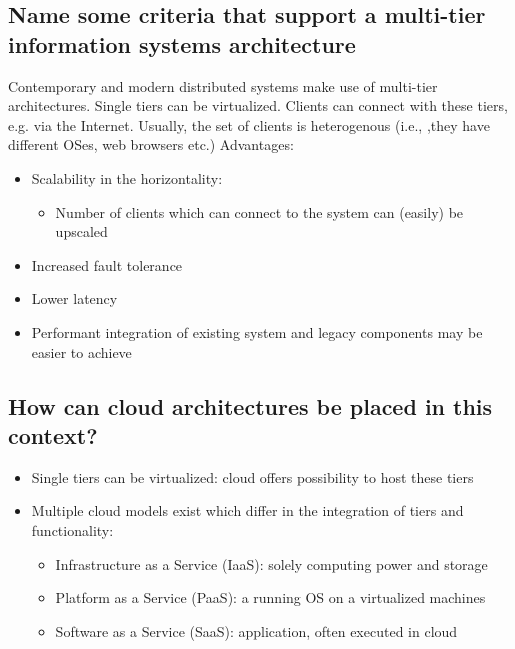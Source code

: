 \documentclass{article}
\begin{document}
\subsection{Name some criteria that support a multi-tier information systems architecture}
Contemporary and modern distributed systems make use of multi-tier architectures. Single tiers can be virtualized.
Clients can connect with these tiers, e.g. via the Internet. Usually, the set of clients is heterogenous (i.e., ,they have different OSes, web browsers etc.)
Advantages:
\begin{itemize}
    \item Scalability in the horizontality:
          \begin{itemize}
              \item Number of clients which can connect to the system can (easily) be upscaled
          \end{itemize}
    \item Increased fault tolerance
    \item Lower latency
    \item Performant integration of existing system and legacy components may be easier to achieve
\end{itemize}

\subsection{How can cloud architectures be placed in this context?}
\begin{itemize}
    \item Single tiers can be virtualized: cloud offers possibility to host these tiers
    \item Multiple cloud models exist which differ in the integration of tiers and functionality:
          \begin{itemize}
              \item Infrastructure as a Service (IaaS): solely computing power and storage
              \item Platform as a Service (PaaS): a running OS on a virtualized machines
              \item Software as a Service (SaaS): application, often executed in cloud
          \end{itemize}
\end{itemize}
\end{document}
